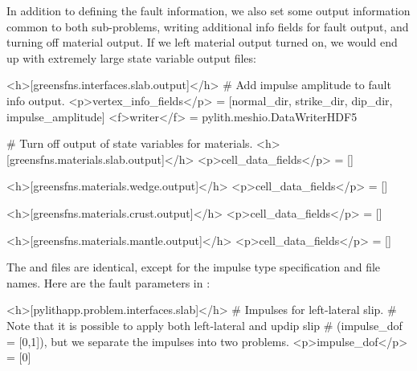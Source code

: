 In addition to defining the fault information, we also set some output
information common to both sub-problems, writing additional info fields
for fault output, and turning off material output. If we left material
output turned on, we would end up with extremely large state variable
output files:
\begin{cfg}
<h>[greensfns.interfaces.slab.output]</h>
# Add impulse amplitude to fault info output.
<p>vertex_info_fields</p> = [normal_dir, strike_dir, dip_dir, impulse_amplitude]
<f>writer</f> = pylith.meshio.DataWriterHDF5

# Turn off output of state variables for materials.
<h>[greensfns.materials.slab.output]</h>
<p>cell_data_fields</p> = []

<h>[greensfns.materials.wedge.output]</h>
<p>cell_data_fields</p> = []

<h>[greensfns.materials.crust.output]</h>
<p>cell_data_fields</p> = []

<h>[greensfns.materials.mantle.output]</h>
<p>cell_data_fields</p> = []
\end{cfg}

The  and  files are
identical, except for the impulse type specification and file
names. Here are the fault parameters in :
\begin{cfg}
<h>[pylithapp.problem.interfaces.slab]</h>
# Impulses for left-lateral slip.
# Note that it is possible to apply both left-lateral and updip slip
# (impulse_dof = [0,1]), but we separate the impulses into two problems.
<p>impulse_dof</p> = [0]
\end{cfg}

